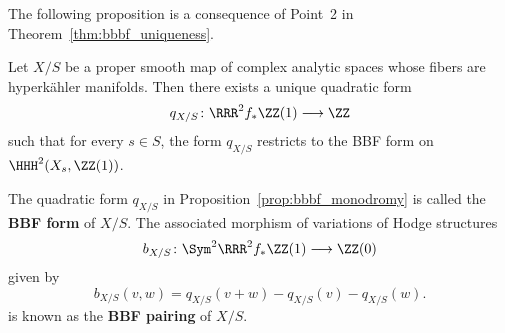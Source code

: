 The following proposition is a consequence of Point~2 in Theorem~\ref{thm:bbbf_uniqueness}.
\begin{proposition}\label{prop:bbbf_monodromy}
Let $X/S$ be a proper smooth map of complex analytic spaces whose fibers are hyperk\"ahler manifolds. Then there exists a unique quadratic form
$$
q_{X/S}\colon \RRR^2 f_* \ZZ(1) \longrightarrow \ZZ
$$ 
such that for every $s \in S$, the form $q_{X/S}$ restricts to the BBF form on $\HHH^2(X_s,\ZZ(1))$.
\end{proposition}

\begin{definition}
The quadratic form $q_{X/S}$ in Proposition~\ref{prop:bbbf_monodromy} is called the {\bfseries BBF form} of $X/S$. The associated morphism of variations of Hodge structures
$$
b_{X/S}\colon \Sym^2 \RRR^2 f_* \ZZ(1) \longrightarrow \ZZ(0)
$$
given by
$$
b_{X/S}(v,w) = q_{X/S}(v + w) - q_{X/S}(v) - q_{X/S}(w).
$$
is known as the {\bfseries BBF pairing} of $X/S$.
\end{definition}
%
%
%
